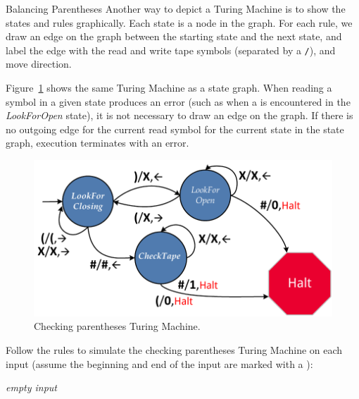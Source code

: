 \begin{schemeregion}
\begin{examplenobar}{Balancing Parentheses}
Another way to depict a Turing Machine is to show the states and rules graphically.  Each state is a node in the graph.  For each rule, we draw an edge on the graph between the starting state and the next state, and label the edge with the read and write tape symbols (separated by a \verb|/|), and move direction.  

Figure~\ref{fig:tm-parens} shows the same Turing Machine as a state graph.  When reading a symbol in a given state produces an error (such as when a \tmtext{)} is encountered in the \emph{LookForOpen} state), it is not necessary to draw an edge on the graph.  If there is no outgoing edge for the current read symbol for the current state in the state graph, execution terminates with an error.

\begin{figure}[!htb]
\begin{center}
\includegraphics[width=4.5in]{figures/tm-parens.pdf}
\caption{Checking parentheses Turing Machine.\label{fig:tm-parens}}
\end{center} 
\end{figure}

\beforeex
\begin{exercise}
Follow the rules to simulate the checking parentheses Turing Machine on each input (assume the beginning and end of the input are marked with a \hash):
\begin{subexerciselist}
\item \tmtext{)}
\item \tmtext{()}
\item \emph{empty input}
\item \tmtext{(()(()))()}
\item \tmtext{(()))(()}
\end{subexerciselist}
\end{exercise}
\afterex
\end{examplenobar}


\end{schemeregion}

